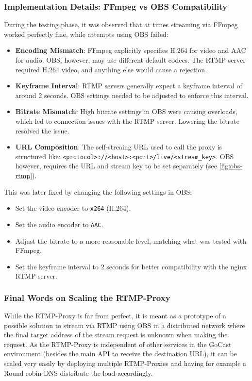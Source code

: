 \subsubsection{Implementation Details: FFmpeg vs OBS Compatibility}

During the testing phase, it was observed that at times streaming via FFmpeg worked perfectly fine, while attempts using OBS failed:
\begin{itemize}
    \item \textbf{Encoding Mismatch}: FFmpeg explicitly specifies H.264 for video and AAC for audio. OBS, however, may use different default codecs. The RTMP server required H.264 video, and anything else would cause a rejection.
    \item \textbf{Keyframe Interval}: RTMP servers generally expect a keyframe interval of around 2 seconds. OBS settings needed to be adjusted to enforce this interval.
    \item \textbf{Bitrate Mismatch}: High bitrate settings in OBS were causing overloads, which led to connection issues with the RTMP server. Lowering the bitrate resolved the issue.
    \item \textbf{URL Composition}: The self-streaing URL used to call the proxy is structured like: \texttt{<protocol>://<host>:<port>/live/<stream\_key>}. OBS however, requires the URL and stream key to be set separately (see \autoref{fig:obs-rtmp}).
\end{itemize}

This was later fixed by changing the following settings in OBS:
\begin{itemize}
    \item Set the video encoder to \texttt{x264} (H.264).
    \item Set the audio encoder to \texttt{AAC}.
    \item Adjust the bitrate to a more reasonable level, matching what was tested with FFmpeg.
    \item Set the keyframe interval to 2 seconds for better compatibility with the nginx \ac{RTMP} server.
\end{itemize}

\subsubsection{Final Words on Scaling the RTMP-Proxy}

While the RTMP-Proxy is far from perfect, it is meant as a prototype of a possible solution to stream via \ac{RTMP} using OBS in a distributed network where the final target address of the stream request is unknown when making the request. As the RTMP-Proxy is independent of other services in the GoCast environment (besides the main \ac{API} to receive the destination URL), it can be scaled very easily by deploying multiple RTMP-Proxies and having for example a Round-robin DNS distribute the load accordingly.

